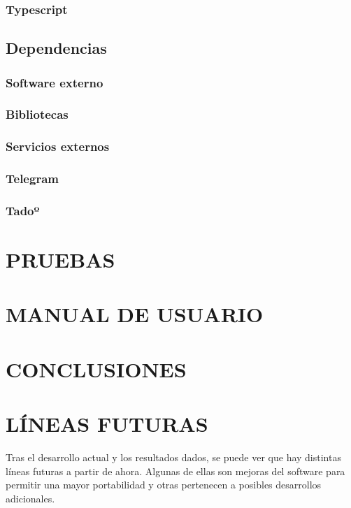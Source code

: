 \documentclass[spanish,12pt, a4paper, twoside]{paper}
\let\oldsection\section
\def\section{\cleardoublepage\oldsection}
\begin{document}
\subsubsection{Typescript}

\subsection{Dependencias}

\subsubsection{Software externo}

\subsubsection{Bibliotecas}

\subsubsection{Servicios externos}

\subsubsection{Telegram}

\subsubsection{Tadoº}

\section{PRUEBAS}

\section{MANUAL DE USUARIO}

\section{CONCLUSIONES}

\section{LÍNEAS FUTURAS}

Tras el desarrollo actual y los resultados dados, se puede ver que hay distintas líneas futuras a partir de ahora. Algunas de ellas son mejoras del software para permitir una mayor portabilidad y otras pertenecen a posibles desarrollos adicionales.
\end{document}
